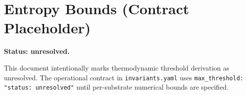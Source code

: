 \section*{Entropy Bounds (Contract Placeholder)}
\textbf{Status: unresolved.}

This document intentionally marks thermodynamic threshold derivation as unresolved.
The operational contract in \texttt{invariants.yaml} uses
\texttt{max_threshold: "status: unresolved"} until per-substrate numerical bounds are specified.

